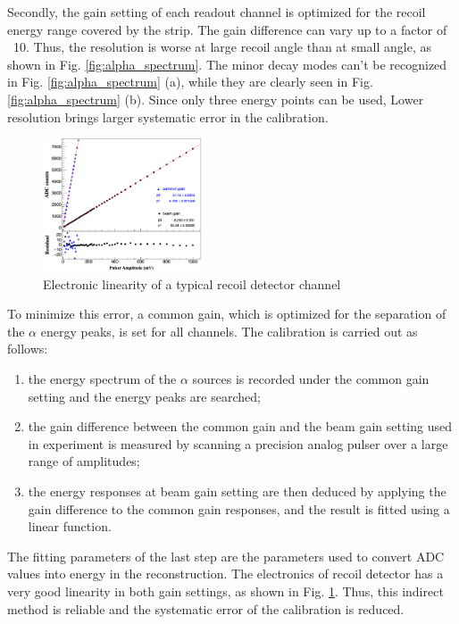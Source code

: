 \documentclass[number,5p]{elsarticle}
\begin{document}
Secondly, the gain setting of each readout channel is optimized for the recoil
energy range covered by the strip.
The gain difference can vary up to a factor of ~10.
Thus, the resolution is worse at large recoil angle than at small angle, as shown in Fig. \ref{fig:alpha_spectrum}.
The minor decay modes can't be recognized in Fig. \ref{fig:alpha_spectrum} (a), while they are clearly seen in Fig. \ref{fig:alpha_spectrum} (b).
Since only three energy points can be used, Lower resolution brings larger systematic error in the calibration.

\begin{figure}[htbp]
\centering
\includegraphics[width=0.42\textwidth]{./linearity.png}
\caption{Electronic linearity of a typical recoil detector channel}
\label{fig:electronic_linearity}
\end{figure}

To minimize this error, a common gain, which is optimized for the separation of the \(\alpha\) energy peaks, is set for all channels.
The calibration is carried out as follows:
\begin{enumerate}
\item the energy spectrum of the \(\alpha\) sources is recorded under the common gain setting and the energy peaks are searched;
\item the gain difference between the common gain and the beam gain setting used
  in experiment is measured by scanning a precision analog pulser over a large range of amplitudes;
\item the energy responses at beam gain setting are then deduced by applying the gain
  difference to the common gain responses, and the result is fitted using a linear function.
\end{enumerate}
The fitting parameters of the last step are the parameters used to convert ADC
values into energy in the reconstruction.
The electronics of recoil detector has a very good linearity in both gain
settings, as shown in Fig. \ref{fig:electronic_linearity}. 
Thus, this indirect method is reliable and the systematic error of the
calibration is reduced.
\end{document}
